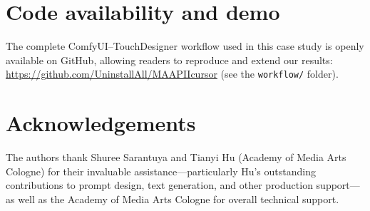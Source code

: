 \documentclass[sigconf,nonacm]{acmart}
\newif\ifanonymous
\begin{document}
\section*{Code availability and demo}
The complete ComfyUI–TouchDesigner workflow used in this case study is openly available on GitHub, allowing readers to reproduce and extend our results: \url{https://github.com/UninstallAll/MAAPIIcursor} (see the \texttt{workflow/} folder).


\ifanonymous
  \section*{Acknowledgements}
  Acknowledgments have been removed for anonymous review and will be restored in the camera-ready version.
\else
    \section*{Acknowledgements}
    The authors thank Shuree Sarantuya and Tianyi Hu (Academy of Media Arts Cologne) for their invaluable assistance—particularly Hu's outstanding contributions to prompt design, text generation, and other production support—as well as the Academy of Media Arts Cologne for overall technical support.
\fi



\clearpage 
\nobalance 

 
\end{document}
